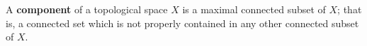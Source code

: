 A \textbf{component} of a topological space $X$ is a maximal connected subset of $X$; that is, a connected set which is not properly contained in any other connected subset of $X$.
